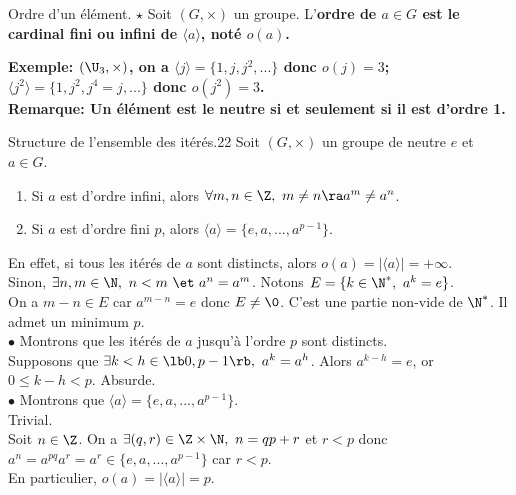 \documentclass[11pt]{article}
\begin{document}
\vspace*{-0.8cm}

\begin{defi}{Ordre d'un élément. $\star$}{}
    Soit $(G,\times)$ un groupe. L'\bf{ordre} de $a\in G$ est le cardinal fini ou infini de $\langle a\rangle $, noté $o(a)$.
\end{defi}

\vspace*{-0.8cm}

\bf{Exemple:} $(\U_3,\times)$, on a $\langle j\rangle=\{1,j,j^2,...\}$ donc $o(j)=3$; $\langle j^2 \rangle=\{1,j^2,j^4=j,...\}$ donc $o(j^2)=3$.\\
\bf{Remarque:} Un élément est le neutre si et seulement si il est d'ordre 1.

\begin{thm}{Structure de l'ensemble des itérés.}{22}
    Soit $(G,\times)$ un groupe de neutre $e$ et $a\in G$.
    \begin{enumerate}
        \item Si $a$ est d'ordre infini, alors $\forall m,n\in\Z, ~ m\neq n \ra a^m \neq a^n$.
        \item Si $a$ est d'ordre fini $p$, alors $\langle a \rangle = \{e,a,...,a^{p-1}\}$.
    \end{enumerate}
    \tcblower
    En effet, si tous les itérés de $a$ sont distincts, alors $o(a)=|\langle a\rangle|=+\infty$.\\
    Sinon, $\exists n,m\in\N, ~ n<m ~\et~ a^n=a^m$. Notons $E=\{k\in\N^*,~a^k=e\}$.\\
    On a $m-n\in E$ car $a^{m-n}=e$ donc $E\neq\0$. C'est une partie non-vide de $\N^*$. Il admet un minimum $p$.\\
    $\bullet$ Montrons que les itérés de $a$ jusqu'à l'ordre $p$ sont distincts.\\
    \hspace*{0.3cm}Supposons que $\exists k<h \in \lb0,p-1\rb, ~ a^k=a^h$. Alors $a^{k-h}=e$, or $0\leq k-h<p$. Absurde.\\
    $\bullet$ Montrons que $\langle a \rangle = \{e,a,...,a^{p-1}\}$.\\
    \boxed{\supset} Trivial.\\
    \boxed{\subset} Soit $n\in\Z$. On a $\exists (q,r)\in\Z\times\N, ~ n=qp+r$ et $r<p$ donc $a^n=a^{pq}a^r=a^r\in\{e,a,...,a^{p-1}\}$ car $r<p$.\\
    En particulier, $o(a)=|\langle a \rangle|=p$.
\end{thm}
\end{document}
